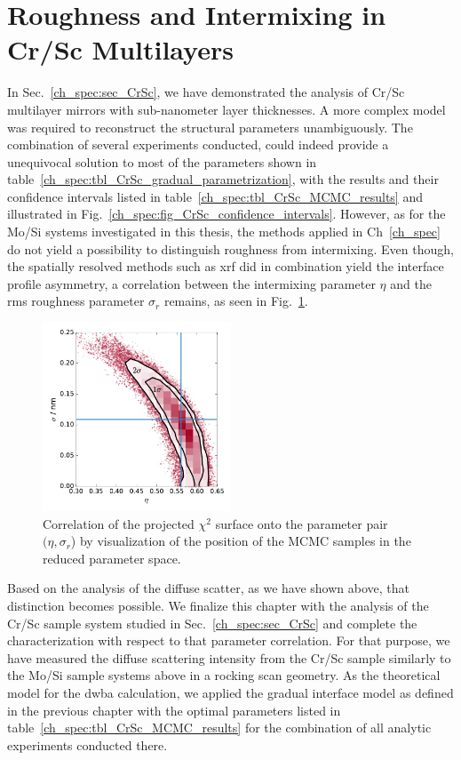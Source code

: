 \section{Roughness and Intermixing in Cr/Sc Multilayers} \label{ch_diff:sec_CrSc}
In Sec.~\ref{ch_spec:sec_CrSc}, we have demonstrated the analysis of Cr/Sc multilayer mirrors with sub-nanometer layer thicknesses. A more complex model was required to reconstruct the structural parameters unambiguously. The combination of several experiments conducted, could indeed provide a unequivocal solution to most of the parameters shown in table~\ref{ch_spec:tbl_CrSc_gradual_parametrization}, with the results and their confidence intervals listed in table~\ref{ch_spec:tbl_CrSc_MCMC_results} and illustrated in Fig.~\ref{ch_spec:fig_CrSc_confidence_intervals}. However, as for the Mo/Si systems investigated in this thesis, the methods applied in Ch~\ref{ch_spec} do not yield a possibility to distinguish roughness from intermixing. Even though, the spatially resolved methods such as \gls{xrf} did in combination yield the interface profile asymmetry, a correlation between the intermixing parameter $\eta$ and the \gls{rms} roughness parameter $\sigma_r$ remains, as seen in Fig.~\ref{ch_diff:fig_eta_sigma_correlation}.
\begin{figure}[htbp]
  \centering
  \includegraphics[width=0.5\textwidth]{images/eta_sigma_correlation}
  \caption{Correlation of the projected $\chi^2$ surface onto the parameter 
pair $(\eta, \sigma_r$) by visualization of the position of the MCMC samples in 
the reduced parameter space.}
  \label{ch_diff:fig_eta_sigma_correlation}
\end{figure}

Based on the analysis of the diffuse scatter, as we have shown above, that distinction becomes possible. We finalize this chapter with the analysis of the Cr/Sc sample system studied in Sec.~\ref{ch_spec:sec_CrSc} and complete the characterization with respect to that parameter correlation. For that purpose, we have measured the diffuse scattering intensity from the Cr/Sc sample similarly to the Mo/Si sample systems above in a rocking scan geometry. As the theoretical model for the \gls{dwba} calculation, we applied the gradual interface model as defined in the previous chapter with the optimal parameters listed in table~\ref{ch_spec:tbl_CrSc_MCMC_results} for the combination of all analytic experiments conducted there.

